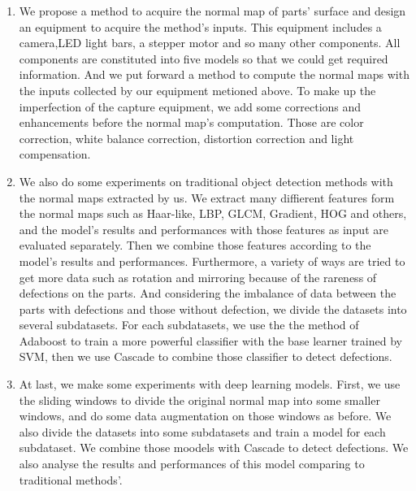 \begin{englishabstract}
\begin{enumerate}
\item We propose a method to acquire the normal map of parts' surface and  design an equipment to acquire the method's inputs. 
This equipment includes a camera,LED light bars, a stepper motor and so many other components. 
All components are constituted into five models so that we could get required information.
And we put forward a method to compute the normal maps with the inputs collected by our equipment metioned above.
To make up the imperfection of the capture equipment,
we add some corrections and enhancements before the normal map's computation.
Those are
color correction,
white balance correction,
distortion correction 
and light compensation.
\item 
We also do some experiments on traditional object detection methods with the normal maps extracted by us.
We extract many diffierent features form the normal maps such as Haar-like, LBP, GLCM, Gradient, HOG and others,
and the model's results and performances with those features as input are evaluated separately.
Then we combine those features according to the model's results and performances. 
Furthermore, a variety of ways are tried to get more data such as rotation and mirroring because of the rareness of defections on the parts.
And considering the imbalance of data between the parts with defections and those without defection, 
we divide the datasets into several subdatasets.
For each subdatasets,
we use the the method of Adaboost to train a more powerful classifier with the base learner trained by SVM, then we use Cascade to combine those classifier to detect defections.
\item At last, we make some experiments with deep learning models. 
First, we use the sliding windows to divide the original normal map into some smaller windows,
and do some data augmentation on those windows as before. 
We also divide the datasets into some subdatasets and train a model for each subdataset.
We combine those moodels with Cascade to detect defections.
We also analyse the results and performances of this model comparing to traditional methods'.
\end{enumerate}






\end{englishabstract}
